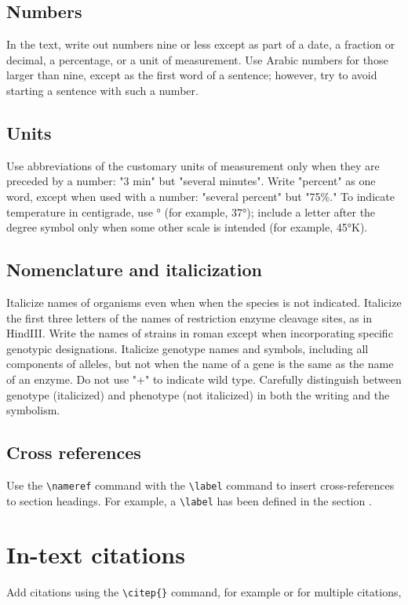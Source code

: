 \documentclass[9pt,twocolumn,twoside,lineno]{gsajnl}
\begin{document}
\subsection{Numbers} In the text, write out numbers nine or less except as part of a date, a fraction or decimal, a percentage, or a unit of measurement. Use Arabic numbers for those larger than nine, except as the first word of a sentence; however, try to avoid starting a sentence with such a number.

\subsection{Units} Use abbreviations of the customary units of measurement only when they are preceded by a number: "3 min" but "several minutes". Write "percent" as one word, except when used with a number: "several percent" but "75\%." To indicate temperature in centigrade, use ° (for example, 37°); include a letter after the degree symbol only when some other scale is intended (for example, 45°K).

\subsection{Nomenclature and italicization} Italicize names of organisms even when  when the species is not indicated.  Italicize the first three letters of the names of restriction enzyme cleavage sites, as in HindIII. Write the names of strains in roman except when incorporating specific genotypic designations. Italicize genotype names and symbols, including all components of alleles, but not when the name of a gene is the same as the name of an enzyme. Do not use "+" to indicate wild type. Carefully distinguish between genotype (italicized) and phenotype (not italicized) in both the writing and the symbolism.

\subsection{Cross references}
Use the \verb|\nameref| command with the \verb|\label| command to insert cross-references to section headings. For example, a \verb|\label| has been defined in the section .

\section{In-text citations}

Add citations using the \verb|\citep{}| command, for example \citep{neher2013genealogies} or for multiple citations, \citep{neher2013genealogies, rodelsperger2014characterization,Falush16}
\end{document}
